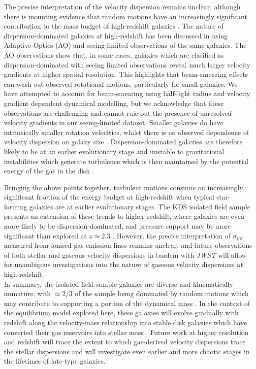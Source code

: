 \documentclass[fleqn,usenatbib]{mnras}
\begin{document}
The precise interpretation of the velocity dispersion remains unclear, although there is mounting evidence that random motions have an increasingly significant contribution to the mass budget of high-redshift galaxies \citep[e.g.][]{Kassin2007,Law2009,Burkert2010,Kassin2012,Wuyts2016b,Lang2017,Ubler2017,Genzel2017}.
The nature of dispersion-dominated galaxies at high-redshift has been discussed in \cite{Newman2013} using Adaptive-Optics (AO) and seeing limited observations of the same galaxies.
The AO observations show that, in some cases, galaxies which are clasified as dispersion-dominated with seeing limited observations reveal much larger velocity gradients at higher spatial resolution.
This highlights that beam-smearing effects can wash-out observed rotational motions, particularly for small galaxies.
We have attempted to account for beam-smearing using half-light radius and velocity gradient dependent dynamical modelling, but we acknowledge that these observations are challenging and cannot rule out the presence of unresolved velocity gradients in our seeing-limited dataset.
Smaller galaxies do have intrinsically smaller rotation velocities, whilst there is no observed dependence of velocity dispersion on galaxy size \citep[e.g.][]{Newman2013}.
Dispersion-dominated galaxies are therefore likely to be at an earlier evolutionary stage and unstable to gravitational instabilities which generate turbulence which is then maintained by the potential energy of the gas in the disk \citep{Burkert2010,Newman2013}.

Bringing the above points together, turbulent motions consume an increasingly significant fraction of the energy budget at high-redshift when typical star-forming galaxies are at earlier evolutionary stages.
The KDS isolated field sample presents an extension of these trends to higher redshift, where galaxies are even more likely to be dispersion-dominated, and pressure support may be more significant than explored at $z\simeq2.3$ \citep{Wuyts2016b,Ubler2017,Genzel2017,Lang2017}.    
However, the precise interpretation of $\sigma_{int}$ measured from ionised gas emission lines remains unclear, and future observations of both stellar and gaseous velocity dispersions in tandem with {\it JWST} will allow for unambigous investigations into the nature of gaseous velocity dispersions at high-redshift. \\


In summary, the isolated field sample galaxies are diverse and kinematically immature, with $\simeq2/3$ of the sample being dominated by random motions which may contribute to supporting a portion of the dynamical mass \citep[e.g.][]{Kassin2007,Burkert2010,Kassin2012,Newman2013,Straatman2017,Ubler2017,Lang2017}.
In the context of the equilibrium model explored here, these galaxies will evolve gradually with redshift along the velocity-mass relationship into stable disk galaxies which have converted their gas reservoirs into stellar mass \citep[e.g.][]{Lilly2013,Tacconi2013,Wisnioski2015,Tacconi2017}. 
Future work at higher resolution and redshift will trace the extent to which gas-derived velocity dispersions trace the stellar dispersions and will investigate even earlier and more chaotic stages in the lifetimes of late-type galaxies.
\end{document}
